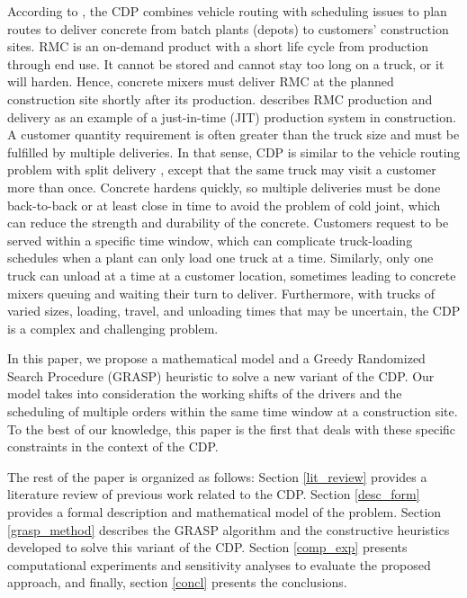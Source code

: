 \documentclass{article}
\begin{document}
According to \cite{blazewicz2019handbook}, the CDP combines vehicle routing with scheduling issues to plan routes to deliver concrete from batch plants (depots) to customers' construction sites. RMC is an on-demand product with a short life cycle from production through end use. It cannot be stored and cannot stay too long on a truck, or it will harden. Hence, concrete mixers must deliver RMC at the planned construction site shortly after its production. \cite{tommelein1999just} describes RMC production and delivery as an example of a just-in-time (JIT) production system in construction. A customer quantity requirement is often greater than the truck size and must be fulfilled by multiple deliveries. In that sense, CDP is similar to the vehicle routing problem with split delivery \citep{archetti2008split}, except that the same truck may visit a customer more than once. Concrete hardens quickly, so multiple deliveries must be done back-to-back or at least close in time to avoid the problem of cold joint, which can reduce the strength and durability of the concrete. Customers request to be served within a specific time window, which can complicate truck-loading schedules when a plant can only load one truck at a time. Similarly, only one truck can unload at a time at a customer location, sometimes leading to concrete mixers queuing and waiting their turn to deliver. Furthermore, with trucks of varied sizes, loading, travel, and unloading times that may be uncertain, the CDP is a complex and challenging problem.

In this paper, we propose a mathematical model and a Greedy Randomized Search Procedure (GRASP) heuristic to solve a new variant of the CDP. Our model takes into consideration the working shifts of the drivers and the scheduling of multiple orders within the same time window at a construction site. To the best of our knowledge, this paper is the first that deals with these specific constraints in the context of the CDP.

The rest of the paper is organized as follows: Section \ref{lit_review} provides a literature review of previous work related to the CDP. Section \ref{desc_form} provides a formal description and mathematical model of the problem. Section \ref{grasp_method} describes the GRASP algorithm and the constructive heuristics developed to solve this variant of the CDP. Section \ref{comp_exp} presents computational experiments and sensitivity analyses to evaluate the proposed approach, and finally, section \ref{concl} presents the conclusions.
\end{document}
